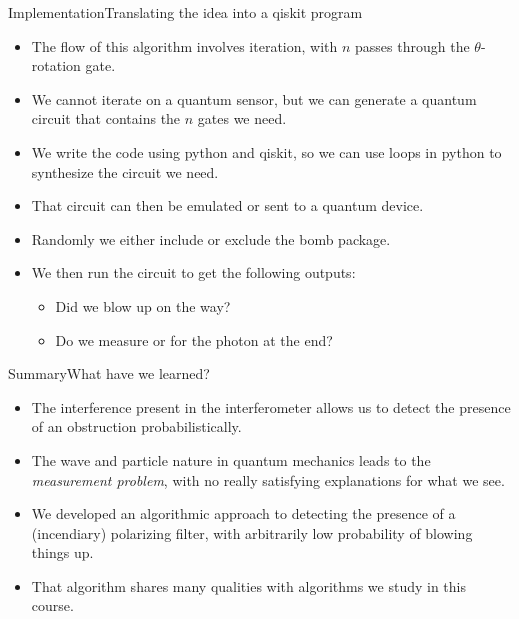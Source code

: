 \begin{frame}{Implementation}{Translating the idea into a qiskit program}
\begin{itemize}
    \item The flow of this algorithm involves iteration, with $n$ passes through the $\theta$-rotation gate.
    \item We cannot iterate on a quantum sensor, but we can generate a quantum circuit that contains the $n$ gates we need.
    \item We write the code using python and qiskit, so we can use loops in python to synthesize the circuit we need.
    \item That circuit can then be emulated or sent to a quantum device.
    \item Randomly we either include or exclude the bomb package.
    \item We then run the circuit to get the following outputs:
    \begin{itemize}
        \item Did we blow up on the way?
        \item Do we measure  or  for the photon at the end?
    \end{itemize}
\end{itemize}



\end{frame}

\begin{frame}{Summary}{What have we learned?}
\begin{itemize}
   \item The interference present in the interferometer allows us to detect the presence of an obstruction probabilistically.
   \item The wave and particle nature in quantum mechanics leads to the \emph{measurement problem}, with no really satisfying explanations for what we see.
   \item We developed an algorithmic approach to detecting the presence of a (incendiary) polarizing filter, with arbitrarily low probability of blowing things up.
   \item That algorithm shares many qualities with algorithms we study in this course.
   \end{itemize}
\end{frame}


